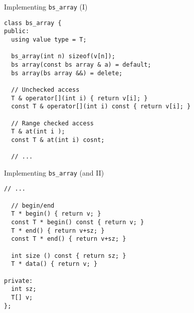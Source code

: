 \begin{frame}[t,fragile]{Implementing \texttt{bs\_array} (I)}
\begin{lstlisting}[style=cpp11]
class bs_array {
public:
  using value type = T;

  bs_array(int n) sizeof(v[n]);
  bs array(const bs array & a) = default;
  bs array(bs array &&) = delete;

  // Unchecked access
  T & operator[](int i) { return v[i]; }
  const T & operator[](int i) const { return v[i]; }

  // Range checked access
  T & at(int i );
  const T & at(int i) cosnt;

  // ...
\end{lstlisting}
\end{frame}

\begin{frame}[t,fragile]{Implementing \texttt{bs\_array} (and II)}
\begin{lstlisting}[style=cpp11]
  // ...

  // begin/end
  T * begin() { return v; }
  const T * begin() const { return v; }
  T * end() { return v+sz; }
  const T * end() { return v+sz; }

  int size () const { return sz; }
  T * data() { return v; }

private:
  int sz;
  T[] v;
};

\end{lstlisting}
\end{frame}
